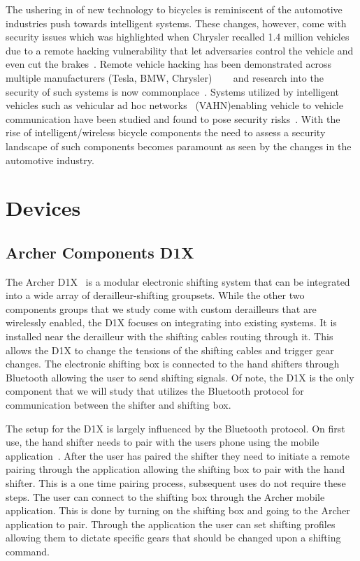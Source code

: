\documentclass[letterpaper,twocolumn,10pt]{article}
\begin{document}
The ushering in of new technology to bicycles is reminiscent of the automotive industries push towards intelligent systems. These changes, however, come with security issues which was highlighted when Chrysler recalled 1.4 million vehicles due to a remote hacking vulnerability that let adversaries control the vehicle and even cut the brakes~\cite{ChryslerRecall}. Remote vehicle hacking has been demonstrated across multiple manufacturers (Tesla, BMW, Chrysler) ~\cite{Tesla}~\cite{BMW}~\cite{Chrysler} and research into the security of such systems is now commonplace~\cite{dibaei2019overview}. Systems utilized by intelligent vehicles such as vehicular ad hoc networks~\cite{SAKIZ201733} (VAHN)enabling vehicle to vehicle communication have been studied and found to pose security risks~\cite{ SAKIZ201733}. With the rise of intelligent/wireless bicycle components the need to assess a security landscape of such components becomes paramount as seen by the changes in the automotive industry.


\section{Devices}
\subsection{Archer Components D1X}

The Archer D1X~\cite{Archer} is a modular electronic shifting system that can be integrated into a wide array of derailleur-shifting groupsets. While the other two components groups that we study come with custom derailleurs that are wirelessly enabled, the D1X focuses on integrating into existing systems. It is installed near the derailleur with the shifting cables routing through it. This allows the D1X to change the tensions of the shifting cables and trigger gear changes. The electronic shifting box is connected to the hand shifters through Bluetooth allowing the user to send shifting signals. Of note, the D1X is the only component that we will study that utilizes the Bluetooth protocol for communication between the shifter and shifting box.

The setup for the D1X is largely influenced by the Bluetooth protocol. On first use, the hand shifter needs to pair with the users phone using the mobile application~\cite{ArcherApp}. After the user has paired the shifter they need to initiate a remote pairing through the application allowing the shifting box to pair with the hand shifter. This is a one time pairing process, subsequent uses do not require these steps. The user can connect to the shifting box through the Archer mobile application. This is done by turning on the shifting box and going to the Archer application to pair. Through the application the user can set shifting profiles allowing them to dictate specific gears that should be changed upon a shifting command.
\end{document}
